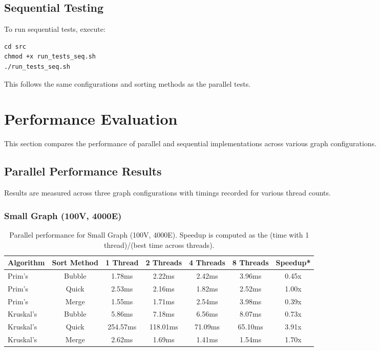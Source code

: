 \documentclass[11pt]{article}
\begin{document}
\subsection{Sequential Testing}
To run sequential tests, execute:
\begin{lstlisting}
cd src
chmod +x run_tests_seq.sh
./run_tests_seq.sh
\end{lstlisting}
This follows the same configurations and sorting methods as the parallel tests.

\section{Performance Evaluation}
This section compares the performance of parallel and sequential implementations across various graph configurations.

\subsection{Parallel Performance Results}
Results are measured across three graph configurations with timings recorded for various thread counts.

\subsubsection*{Small Graph (100V, 4000E)}
\begin{table}[H]
    \centering
    \begin{tabular}{lcccccc}
        \toprule
        \textbf{Algorithm} & \textbf{Sort Method} & \textbf{1 Thread} & \textbf{2 Threads} & \textbf{4 Threads} & \textbf{8 Threads} & \textbf{Speedup*} \\
        \midrule
        Prim's    & Bubble & 1.78ms  & 2.22ms  & 2.42ms  & 3.96ms  & 0.45x \\
        Prim's    & Quick  & 2.53ms  & 2.16ms  & 1.82ms  & 2.52ms  & 1.00x \\
        Prim's    & Merge  & 1.55ms  & 1.71ms  & 2.54ms  & 3.98ms  & 0.39x \\
        \midrule
        Kruskal's & Bubble & 5.86ms  & 7.18ms  & 6.56ms  & 8.07ms  & 0.73x \\
        Kruskal's & Quick  & 254.57ms& 118.01ms& 71.09ms & 65.10ms & 3.91x \\
        Kruskal's & Merge  & 2.62ms  & 1.69ms  & 1.41ms  & 1.54ms  & 1.70x \\
        \bottomrule
    \end{tabular}
    \caption{Parallel performance for Small Graph (100V, 4000E). Speedup is computed as the (time with 1 thread)/(best time across threads).}
    \label{tab:small_parallel}
\end{table}
\end{document}
